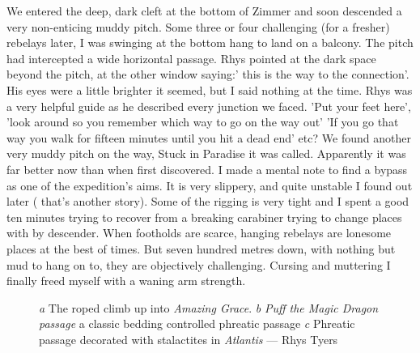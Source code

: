 We entered the deep, dark cleft at the bottom of Zimmer and soon descended a very non-enticing muddy pitch. Some three or four challenging (for a fresher) rebelays later, I was swinging at the bottom hang to land on a balcony. The pitch had intercepted a wide horizontal passage. Rhys pointed at the dark space beyond the pitch, at the other window saying:' this is the way to the connection'. His eyes were a little brighter it seemed, but I said nothing at the time. Rhys was a very helpful guide as he described every junction we faced. 'Put your feet here', 'look around so you remember which way to go on the way out' 'If you go that way you walk for fifteen minutes until you hit a dead end' etc? We found another very muddy pitch on the way, Stuck in Paradise it was called. Apparently it was far better now than when first discovered. I made a mental note to find a bypass as one of the expedition's aims. It is very slippery, and quite unstable I found out later ( that's another story). Some of the rigging is very tight and I spent a good ten minutes trying to recover from a breaking carabiner trying to change places with by descender. When footholds are scarce, hanging rebelays are lonesome places at the best of times. But seven hundred metres down, with nothing but mud to hang on to, they are objectively challenging. Cursing and muttering I finally freed myself with a waning arm strength.

\begin{figure}[t!]
\checkoddpage \ifoddpage \forcerectofloat \else \forceversofloat \fi
\centering
    \begin{subfigure}[t]{0.393\textwidth}
        \centering
        \caption{} \label{HelmsDeep}
    \end{subfigure}
        \hfill
\begin{subfigure}[t]{0.59\textwidth}
\centering
{}
 \caption{}\label{water chamber below helm's deep}
\end{subfigure}
    \vspace{0cm}
    \begin{subfigure}[t]{\textwidth}
    \centering
        \caption{} \label{Touching the Void}
    \end{subfigure}
    \caption{
    \emph{a} The roped climb up into \emph{Amazing Grace}.  
     \emph{b} \emph{Puff the Magic Dragon passage} a classic bedding controlled phreatic passage
     \emph{c} Phreatic passage decorated with stalactites in \emph{Atlantis} --- Rhys Tyers }
\end{figure}

